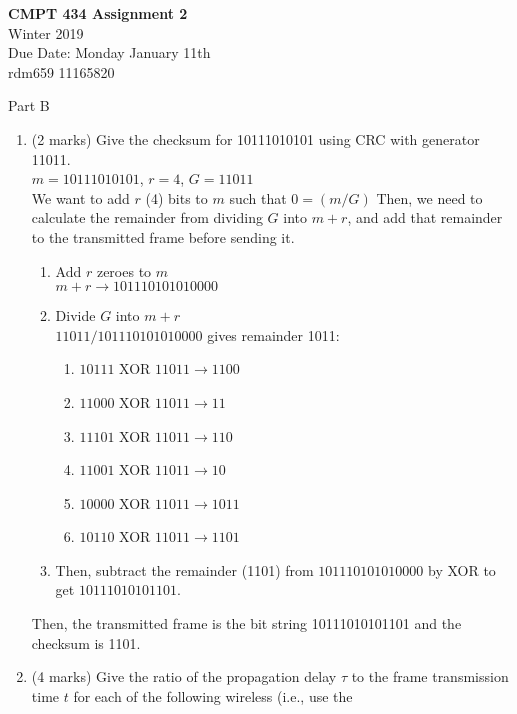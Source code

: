 \documentclass[10pt]{amsart}
\begin{document}
 \textbf{CMPT 434 Assignment 2} \\ Winter 2019\\
Due Date: Monday January 11th\\
rdm659 11165820

Part B

\begin{enumerate}
    \item (2 marks) Give the checksum for 10111010101 using CRC with
        generator 11011.\\
        $m = 10111010101$, $r = 4$, $G = 11011$\\
        We want to add $r$ (4) bits to $m$ such that $0 = (m / G)$
        Then, we need to calculate the remainder from dividing $G$ into $m + r$,
        and add that remainder to the transmitted frame before sending it.\\
        \begin{enumerate}
            \item Add $r$ zeroes to $m$\\
                $m+r \rightarrow 101110101010000$
            \item Divide $G$ into $m+r$\\
                $11011 / 101110101010000$ gives remainder 1011:\\
                \begin{enumerate}
                    \item $10111$ XOR $11011 \rightarrow 1100$
                    \item $11000$ XOR $11011 \rightarrow 11$
                    \item $11101$ XOR $11011 \rightarrow 110$
                    \item $11001$ XOR $11011 \rightarrow 10$
                    \item $10000$ XOR $11011 \rightarrow 1011$
                    \item $10110$ XOR $11011 \rightarrow 1101$
                \end{enumerate}
            \item 
                Then, subtract the remainder (1101) from $101110101010000$ by
                XOR to get $10111010101101$.
        \end{enumerate}
        Then, the transmitted frame is the bit string 10111010101101 and the
        checksum is 1101.
    \item (4 marks) Give the ratio of the propagation delay $\tau$ to the frame
        transmission time $t$ for each of the following wireless (i.e., use the

\end{enumerate}
\end{document}
